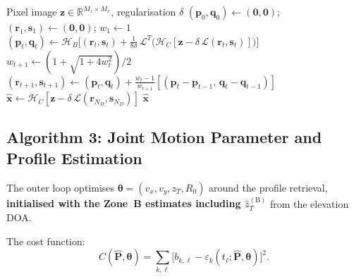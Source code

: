 \documentclass[11pt,a4paper]{article}
\newcommand{\R}{\mathbb{R}}
\begin{document}
\begin{algorithm}[H]
\caption{TV denoising:
$\mathrm{prox}_{\mathcal{R}}(\mathbf{z},\delta)$}
\label{alg:tv_denoise}
\begin{algorithmic}[1]
\Require Pixel image $\mathbf{z}\in\R^{M_z\times M_x}$,
regularisation $\delta$
\State $(\mathbf{p}_0,\mathbf{q}_0)\leftarrow(\mathbf{0},\mathbf{0})$;
$(\mathbf{r}_1,\mathbf{s}_1)\leftarrow(\mathbf{0},\mathbf{0})$;
$w_1\leftarrow 1$
  \State $(\mathbf{p}_t,\mathbf{q}_t) \leftarrow
    \mathcal{H}_B\!\bigl[(\mathbf{r}_t,\mathbf{s}_t)
    + \tfrac{1}{8\delta}\,\mathcal{L}^T\!\bigl(
    \mathcal{H}_C[\mathbf{z}{-}\delta\,
    \mathcal{L}(\mathbf{r}_t,\mathbf{s}_t)]\bigr)\bigr]$
  \State $w_{t+1}\leftarrow(1{+}\sqrt{1{+}4w_t^2})/2$
  \State $(\mathbf{r}_{t+1},\mathbf{s}_{t+1})\leftarrow
    (\mathbf{p}_t,\mathbf{q}_t)
    +\tfrac{w_t-1}{w_{t+1}}
    [(\mathbf{p}_t{-}\mathbf{p}_{t-1},\,
    \mathbf{q}_t{-}\mathbf{q}_{t-1})]$
\EndFor
\State $\hat{\mathbf{x}}\leftarrow
  \mathcal{H}_C[\mathbf{z}{-}\delta\,
  \mathcal{L}(\mathbf{r}_{N_D},\mathbf{s}_{N_D})]$
\State \Return $\hat{\mathbf{x}}$
\end{algorithmic}
\end{algorithm}

\subsection{Algorithm 3: Joint Motion Parameter and Profile Estimation}
\label{sec:alg3}

The outer loop optimises $\bm{\theta}=(v_x,v_y,z_T,R_0)$ around the
profile retrieval, \textbf{initialised with the Zone~B estimates
including $\hat{z}_T^{(\mathrm{B})}$} from the elevation DOA.

The cost function:
\begin{equation}
  C(\hat{\mathbf{P}},\bm{\theta})
  = \sum_{k,\ell}\bigl[b_{k,\ell}
  - \varepsilon_k(t_\ell;\hat{\mathbf{P}},\bm{\theta})\bigr]^2.
  \label{eq:cost_joint}
\end{equation}
\end{document}
